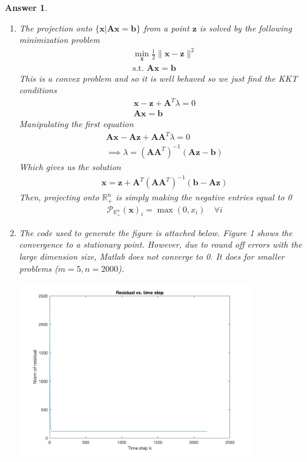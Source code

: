 \documentclass[12pt]{article}
\theoremstyle{colon}
\newtheorem*{answer}{Answer}
\begin{document}
\begin{answer}
	\

	\begin{enumerate}[label=\alph*)]
		\item The projection onto $\{\bm{x} | \bm{A} \bm{x} = \bm{b} \}$ from a point $\bm{z}$ is solved by the following minimization problem
			\begin{gather*}
				\min_{\bm{x}} \frac{1}{2} \lVert \bm{x} - \bm{z} \rVert^2 \\
				\text{s.t. } \bm{A} \bm{x} = \bm{b} 
			\end{gather*}
			This is a convex problem and so it is well behaved so we just find the KKT conditions
			\begin{gather*}
				\bm{x} - \bm{z} + \bm{A}^T \lambda = 0 \\
				\bm{A} \bm{x} = \bm{b}
			\end{gather*}
			Manipulating the first equation
			\begin{gather*}
				\bm{A} \bm{x} - \bm{A} \bm{z} + \bm{A} \bm{A}^T \lambda = 0 \\
				\implies \lambda = (\bm{A} \bm{A}^T)^{-1} (\bm{A} \bm{z} - \bm{b})
			\end{gather*}
			Which gives us the solution
			\begin{gather*}
				\bm{x} = \bm{z} + \bm{A}^T (\bm{A} \bm{A}^T)^{-1} (\bm{b} - \bm{A} \bm{z})
			\end{gather*}
			Then, projecting onto $\mathbb{R}_+^n$ is simply making the negative entries equal to 0
			\begin{gather*}
				\mathcal{P}_{\mathbb{R}_+^n} (\bm{x})_i = \max(0, x_i) \quad \forall i
			\end{gather*}

		\item The code used to generate the figure is attached below. Figure 1 shows the convergence to a stationary point. However, due to round off errors with the large dimension size, Matlab does not converge to 0. It does for smaller problems ($m = 5, n = 2000$).

			\begin{center}
		        \includegraphics[width=0.8\textwidth]{2b.jpg}
			\end{center}


\end{enumerate}
\end{answer}
\end{document}
